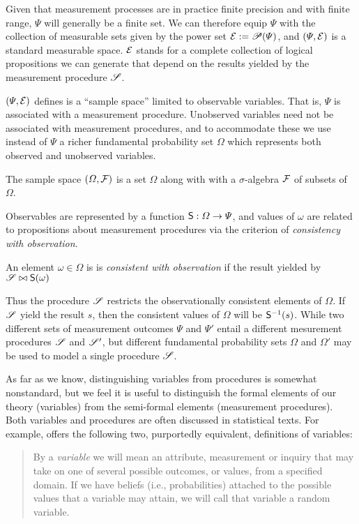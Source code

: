 Given that measurement processes are in practice finite precision and with finite range, $\Psi$ will generally be a finite set. We can therefore equip $\Psi$ with the collection of measurable sets given by the power set $\mathcal{E}:=\mathscr{P}(\Psi)$, and $(\Psi,\mathcal{E})$ is a standard measurable space. $\mathcal{E}$ stands for a complete collection of logical propositions we can generate that depend on the results yielded by the measurement procedure $\mathscr{S}$.

$(\Psi,\mathcal{E})$ defines is a ``sample space'' limited to observable variables. That is, $\Psi$ is associated with a measurement procedure. Unobserved variables need not be associated with measurement procedures, and to accommodate these we use instead of $\Psi$ a richer fundamental probability set $\Omega$ which represents both observed and unobserved variables.

\begin{definition}
The sample space $(\Omega,\mathcal{F})$ is a set $\Omega$ along with with a $\sigma$-algebra $\mathcal{F}$ of subsets of $\Omega$.
\end{definition}

Observables are represented by a function $\mathsf{S}:\Omega\to \Psi$, and values of $\omega$ are related to propositions about measurement procedures via the criterion of \emph{consistency with observation}.

\begin{definition}\label{def:observable}
An element $\omega\in \Omega$ is is \emph{consistent with observation} if the result yielded by $\mathscr{S}\bowtie \mathsf{S}(\omega)$
\end{definition}

Thus the procedure $\mathscr{S}$ restricts the observationally consistent elements of $\Omega$. If $\mathscr{S}$ yield the result $s$, then the consistent values of $\Omega$ will be $\mathsf{S}^{-1}(s)$. While two different sets of measurement outcomes $\Psi$ and $\Psi'$ entail a different mesurement procedures $\mathscr{S}$ and $\mathscr{S}'$, but different fundamental probability sets $\Omega$ and $\Omega'$ may be used to model a single procedure $\mathscr{S}$.

As far as we know, distinguishing variables from procedures is somewhat nonstandard, but we feel it is useful to distinguish the formal elements of our theory (variables) from the semi-formal elements (measurement procedures). Both variables and procedures are often discussed in statistical texts. For example, \citet{pearl_causality:_2009} offers the following two, purportedly equivalent, definitions of variables:
\begin{quote}
By a \emph{variable} we will mean an attribute, measurement or inquiry that may take on one of several possible outcomes, or values, from a specified domain. If we have beliefs (i.e., probabilities) attached to the possible values that a variable may attain, we will call that variable a random variable.
\end{quote}

